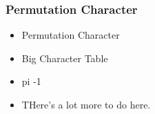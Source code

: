 \subsubsection{Permutation Character}




\begin{itemize}
    \item Permutation Character
    \item Big Character Table
    \item pi -1
    \item THere's a lot more to do here.
\end{itemize}



 



